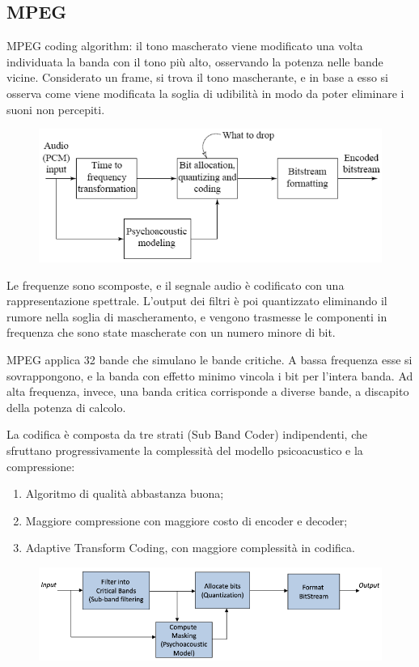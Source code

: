  \subsection{MPEG}
MPEG coding algorithm: il tono mascherato viene modificato una volta individuata la banda con il tono più alto, osservando la potenza nelle bande vicine. Considerato un frame, si trova il tono mascherante, e in base a esso si osserva come viene modificata la soglia di udibilità in modo da poter eliminare i suoni non percepiti. 

\begin{figure}[h]
	\centering
	\includegraphics[scale=0.5]{Lezioni/Immagini/mpeg-coding-audio}
\end{figure}

Le frequenze sono scomposte, e il segnale audio è codificato con una rappresentazione spettrale. L'output dei filtri è poi quantizzato eliminando il rumore nella soglia di mascheramento, e vengono trasmesse le componenti in frequenza che sono state mascherate con un numero minore di bit.

MPEG applica 32 bande che simulano le bande critiche. A bassa frequenza esse si sovrappongono, e la banda con effetto minimo vincola i bit per l'intera banda. Ad alta frequenza, invece, una banda critica corrisponde a diverse bande, a discapito della potenza di calcolo.

La codifica è composta da tre strati (Sub Band Coder) indipendenti, che sfruttano progressivamente la complessità del modello psicoacustico e la compressione: 
\begin{enumerate}
	\item Algoritmo di qualità abbastanza buona;
	\item Maggiore compressione con maggiore costo di encoder e decoder;
	\item Adaptive Transform Coding, con maggiore complessità in codifica.
\end{enumerate}

\begin{figure}[h]
	\centering
	\includegraphics[scale=0.5]{Lezioni/Immagini/mpeg-coding}
\end{figure}

